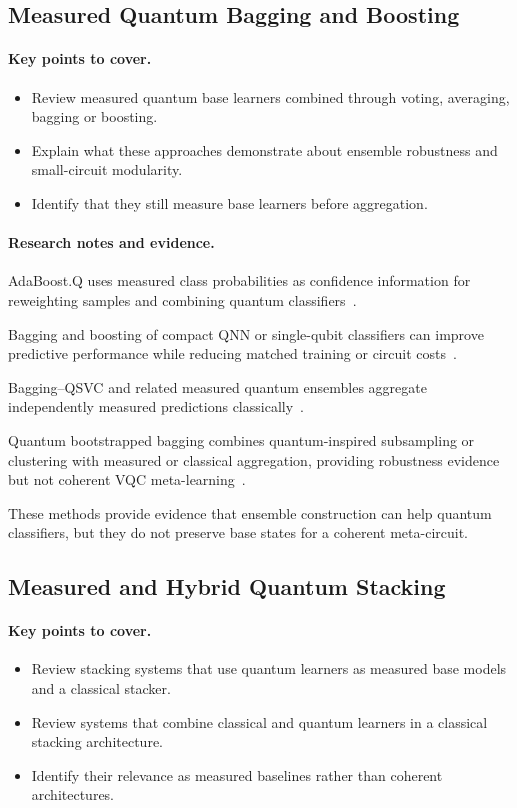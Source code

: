 \documentclass[]{UCD_CS_MSc_AAI_Report}
\newcommand{\method}[1]{{\color{cyan!80!black}#1}}
\newcommand{\comparison}[1]{{\color{pink!70!violet}#1}}
\newcommand{\sectionbrief}{\paragraph{Key points to cover.}}
\newcommand{\researchnotes}{\paragraph{Research notes and evidence.}}
\begin{document}
\subsection{Measured Quantum Bagging and Boosting}

\sectionbrief
\begin{itemize}
    \item Review measured quantum base learners combined through voting, averaging, bagging or boosting.
    \item Explain what these approaches demonstrate about ensemble robustness and small-circuit modularity.
    \item Identify that they still measure base learners before aggregation.
\end{itemize}

\researchnotes
\begin{itemize}
    \method{\item AdaBoost.Q uses measured class probabilities as confidence information for reweighting samples and combining quantum classifiers~\cite{song_quantum_2024}.}
    \method{\item Bagging and boosting of compact QNN or single-qubit classifiers can improve predictive performance while reducing matched training or circuit costs~\cite{mcfarthing_classical_2024,incudini_resource_2023}.}
    \method{\item Bagging--QSVC and related measured quantum ensembles aggregate independently measured predictions classically~\cite{abdulsalam_explainable_2023}.}
    \method{\item Quantum bootstrapped bagging combines quantum-inspired subsampling or clustering with measured or classical aggregation, providing robustness evidence but not coherent VQC meta-learning~\cite{rathi_quantum_2025}.}
    \comparison{\item These methods provide evidence that ensemble construction can help quantum classifiers, but they do not preserve base states for a coherent meta-circuit.}
\end{itemize}

\subsection{Measured and Hybrid Quantum Stacking}

\sectionbrief
\begin{itemize}
    \item Review stacking systems that use quantum learners as measured base models and a classical stacker.
    \item Review systems that combine classical and quantum learners in a classical stacking architecture.
    \item Identify their relevance as measured baselines rather than coherent architectures.
\end{itemize}
\end{document}
